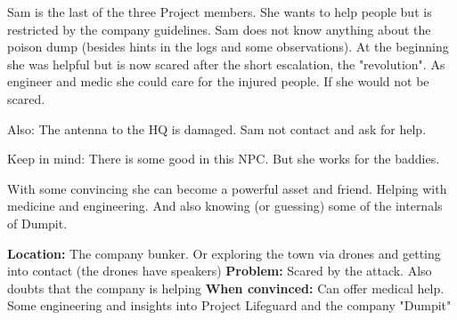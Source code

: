 \begin{npcBox}[title=Sam]
    \begin{consequences}
    \item {}
    \item {}
    \item {}
    \end{consequences}

    \begin{npcDescription}
    Sam is the last of the three Project members. She wants to help people but is restricted by the company guidelines. Sam does not know anything about the poison dump (besides hints in the logs and some observations). At the beginning she was helpful but is now scared after the short escalation, the "revolution". As engineer and medic she could care for the injured people. If she would not be scared.

    Also: The antenna to the HQ is damaged. Sam not contact and ask for help.

    Keep in mind: There is some good in this NPC. But she works for the baddies.

    With some convincing she can become a powerful asset and friend. Helping with medicine and engineering. And also knowing (or guessing) some of the internals of Dumpit.

    \textbf{Location:} The company bunker. Or exploring the town via drones and getting into contact (the drones have speakers)
    \textbf{Problem:} Scared by the attack. Also doubts that the company is helping
    \textbf{When convinced:} Can offer medical help. Some engineering and insights into Project Lifeguard and the company "Dumpit"
    \end{npcDescription}

\end{npcBox}

\newpage

